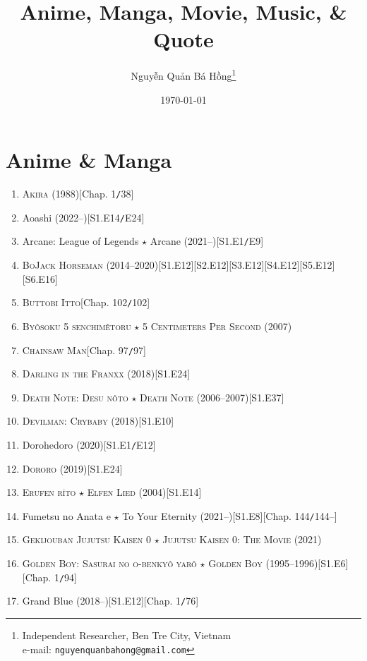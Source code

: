 \documentclass[oneside]{book}
\title{Anime, Manga, Movie, Music, {\large\&} Quote}
\author{\selectlanguage{vietnamese} Nguyễn Quản Bá Hồng\footnote{Independent Researcher, Ben Tre City, Vietnam\\e-mail: \texttt{nguyenquanbahong@gmail.com}}}
\date{\today}
\numberwithin{equation}{section}
\begin{document}
\maketitle
\tableofcontents


\chapter{Anime \& Manga}

\begin{enumerate}
    \item \textsc{Akira} (1988)\hfill[Chap. 1\texttt{/}38]
    \item Aoashi (2022--)\hfill[S1.E14\texttt{/}E24]
    \item Arcane: League of Legends $\star$ Arcane (2021--)\hfill[S1.E1\texttt{/}E9]
    \item \textsc{BoJack Horseman} (2014--2020)\hfill[S1.E12][S2.E12][S3.E12][S4.E12][S5.E12][S6.E16]
    \item \textsc{Buttobi Itto}\hfill[Chap. 102\texttt{/}102]
    \item \textsc{By\^osoku 5 senchimêtoru $\star$ 5 Centimeters Per Second} (2007)
    \item \textsc{Chainsaw Man}\hfill[Chap. 97\texttt{/}97]
    \item \textsc{Darling in the Franxx} (2018)\hfill[S1.E24]
    \item \textsc{Death Note: Desu n\^oto $\star$ Death Note} (2006--2007)\hfill[S1.E37]
    \item \textsc{Devilman: Crybaby} (2018)\hfill[S1.E10]
    \item Dorohedoro (2020)\hfill[S1.E1\texttt{/}E12]
    \item \textsc{Dororo} (2019)\hfill[S1.E24]
    \item \textsc{Erufen r\^{\i}to $\star$ Elfen Lied} (2004)\hfill[S1.E14]
    \item Fumetsu no Anata e $\star$ To Your Eternity (2021--)\hfill[S1.E8][Chap. 144\texttt{/}144--]
    \item \textsc{Gekijouban Jujutsu Kaisen 0 $\star$ Jujutsu Kaisen 0: The Movie} (2021)
    \item \textsc{Golden Boy: Sasurai no o-benky\^o yar\^o $\star$ Golden Boy} (1995--1996)\hfill[S1.E6][Chap. 1\texttt{/}94]
    \item Grand Blue (2018--)\hfill[S1.E12][Chap. 1\texttt{/}76]

\end{enumerate}
\end{document}
